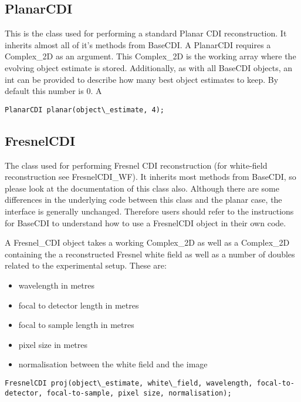\documentclass[]{nadia}
\begin{document}
\subsection{PlanarCDI}
This is the class used for performing a standard Planar CDI reconstruction. It inherits almost all of it's methods from BaseCDI. A PlanarCDI requires a Complex\_2D as an argument. This Complex\_2D is the working array where the evolving object estimate is stored. Additionally, as with all BaseCDI objects, an int can be provided to describe how many best object estimates to keep. By default this number is 0. A 
\begin{verbatim}
PlanarCDI planar(object\_estimate, 4);
\end{verbatim}

\subsection{FresnelCDI}
The class used for performing Fresnel CDI reconstruction (for
white-field reconstruction see FresnelCDI\_WF). It inherits most
methods from BaseCDI, so please look at the documentation of this
class also. Although there are some differences in the underlying code
between this class and the planar case, the interface is generally
unchanged. Therefore users should refer to the instructions for
BaseCDI to understand how to use a FresnelCDI object in their own
code. 

A Fresnel\_CDI object takes a working Complex\_2D as well as a Complex\_2D containing 
the a reconstructed Fresnel white field as well as a number of doubles related to the 
experimental setup. These are:
\begin{itemize}
\item wavelength in metres
\item focal to detector length in metres
\item focal to sample length in metres
\item pixel size in metres
\item normalisation between the white field and the image
\end{itemize}

\begin{verbatim}
FresnelCDI proj(object\_estimate, white\_field, wavelength, focal-to-detector, focal-to-sample, pixel size, normalisation);

\end{verbatim}
\end{document}
